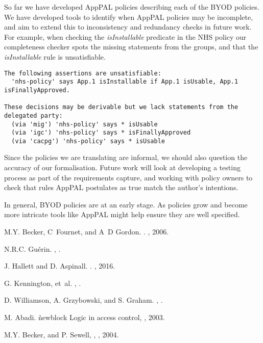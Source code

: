 \documentclass{easychair}
\begin{document}
So far we have developed AppPAL policies describing each of the BYOD policies.
We have developed tools to identify when AppPAL policies may be incomplete, and aim to extend this to inconsistency and redundancy checks in future work.
For example, when checking the \emph{isInstallable} predicate in the NHS policy our completeness checker spots the missing statements from the groups, and that the \emph{isInstallable} rule is unsatisfiable.
\begin{lstlisting}
The following assertions are unsatisfiable:
  'nhs-policy' says App.1 isInstallable if App.1 isUsable, App.1 isFinallyApproved.

These decisions may be derivable but we lack statements from the delegated party:
  (via 'mig') 'nhs-policy' says * isUsable
  (via 'igc') 'nhs-policy' says * isFinallyApproved
  (via 'cacpg') 'nhs-policy' says * isUsable
\end{lstlisting}
Since the policies we are translating are informal, we should also question the accuracy of our formalisation.
Future work will look at developing a testing process as part of the requirements capture, and working with policy owners to check that rules AppPAL postulates as true match the author's intentions.

In general, BYOD policies are at an early stage.
As policies grow and become more intricate tools like AppPAL might help ensure they are well specified.


\begin{thebibliography}{1}
M.Y. Becker, C~Fournet, and A~D Gordon.
.
, 2006.

N.R.C. Gu{\'e}rin.
,
.%

J. Hallett and D. Aspinall.
.
, 2016.

G. Kennington, et~al.
,
.%

D. Williamson, A. Grzybowski, and S. Graham.
,
.%

M. Abadi.
\`newblock {Logic in access control},
, 2003.

M.Y. Becker, and P. Sewell,
,
, 2004.
\end{thebibliography}
\end{document}
